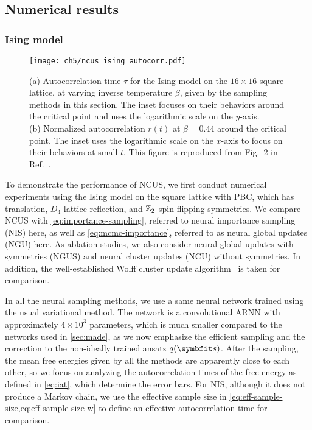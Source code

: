 \subsection{Numerical results}

\subsubsection{Ising model}

\begin{figure}[htb]
\centering
\texttt{[image: ch5/ncus\_ising\_autocorr.pdf]}
\caption[NCUS results of Ising model]{
(a) Autocorrelation time $\tau$ for the Ising model on the $16 \times 16$ square lattice, at varying inverse temperature $\beta$, given by the sampling methods in this section.
The inset focuses on their behaviors around the critical point and uses the logarithmic scale on the $y$-axis. \\
(b) Normalized autocorrelation $r(t)$ at $\beta = 0.44$ around the critical point.
The inset uses the logarithmic scale on the $x$-axis to focus on their behaviors at small $t$.
This figure is reproduced from Fig.~2 in Ref.~\cite{wu2021unbiased}.
}
\label{fig:ncus-ising-autocorr}
\end{figure}

To demonstrate the performance of NCUS, we first conduct numerical experiments using the Ising model on the square lattice with PBC, which has translation, $D_4$ lattice reflection, and $\mathbb{Z}_2$ spin flipping symmetries. We compare NCUS with \cref{eq:importance-sampling}, referred to neural importance sampling (NIS) here, as well as \cref{eq:mcmc-importance}, referred to as neural global updates (NGU) here. As ablation studies, we also consider neural global updates with symmetries (NGUS) and neural cluster updates (NCU) without symmetries. In addition, the well-established Wolff cluster update algorithm~\cite{wolff1989collective} is taken for comparison.

In all the neural sampling methods, we use a same neural network trained using the usual variational method. The network is a convolutional ARNN with approximately $4 \times 10^3$ parameters, which is much smaller compared to the networks used in \cref{sec:made}, as we now emphasize the efficient sampling and the correction to the non-ideally trained ansatz $q(\vs)$. After the sampling, the mean free energies given by all the methods are apparently close to each other, so we focus on analyzing the autocorrelation times of the free energy as defined in \cref{eq:iat}, which determine the error bars. For NIS, although it does not produce a Markov chain, we use the effective sample size in \cref{eq:eff-sample-size,eq:eff-sample-size-w} to define an effective autocorrelation time for comparison.

